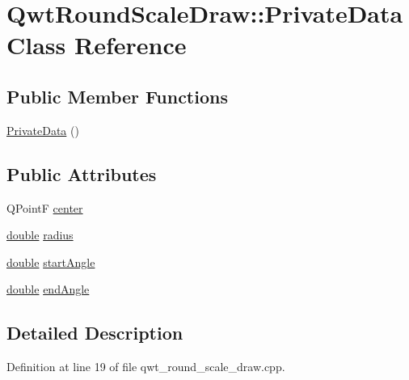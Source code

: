 \hypertarget{class_qwt_round_scale_draw_1_1_private_data}{\section{Qwt\-Round\-Scale\-Draw\-:\-:Private\-Data Class Reference}
\label{class_qwt_round_scale_draw_1_1_private_data}
}
\subsection*{Public Member Functions}
\begin{DoxyCompactItemize}
\item 
\hyperlink{class_qwt_round_scale_draw_1_1_private_data_ad0236ef8ad92969ee0060b8bf50bca49}{Private\-Data} ()
\end{DoxyCompactItemize}
\subsection*{Public Attributes}
\begin{DoxyCompactItemize}
\item 
Q\-Point\-F \hyperlink{class_qwt_round_scale_draw_1_1_private_data_a6b75b83dbe540b85fa1d78b96082fa5c}{center}
\item 
\hyperlink{_super_l_u_support_8h_a8956b2b9f49bf918deed98379d159ca7}{double} \hyperlink{class_qwt_round_scale_draw_1_1_private_data_a91d68095489466256eff9645dfea424f}{radius}
\item 
\hyperlink{_super_l_u_support_8h_a8956b2b9f49bf918deed98379d159ca7}{double} \hyperlink{class_qwt_round_scale_draw_1_1_private_data_a500bc10db11a7e3c9b290b80b29d39b0}{start\-Angle}
\item 
\hyperlink{_super_l_u_support_8h_a8956b2b9f49bf918deed98379d159ca7}{double} \hyperlink{class_qwt_round_scale_draw_1_1_private_data_a4c3d78506abaa7239991bfa5b871a005}{end\-Angle}
\end{DoxyCompactItemize}


\subsection{Detailed Description}


Definition at line 19 of file qwt\-\_\-round\-\_\-scale\-\_\-draw.\-cpp.



